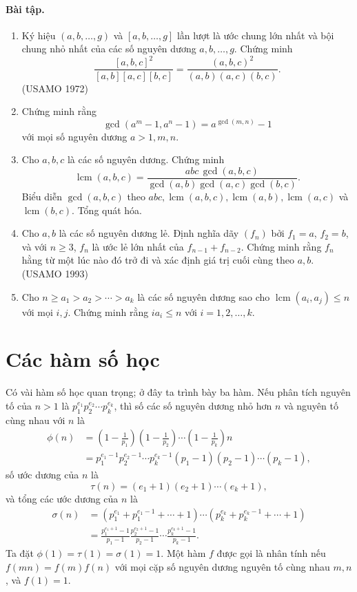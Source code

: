 \documentclass[11pt]{article}
\DeclareMathOperator{\lcm}{lcm}
\begin{document}
\paragraph{Bài tập.}
\begin{enumerate}
\item Ký hiệu \((a,b,\ldots,g)\) và \([a,b,\ldots,g]\) lần lượt là ước chung
lớn nhất và bội chung nhỏ nhất của các số nguyên dương \(a,b,\ldots,g\).
Chứng minh
\[
 \frac{[a,b,c]^2}{[a,b][a,c][b,c]}
 =
 \frac{(a,b,c)^2}{(a,b)(a,c)(b,c)}.
\]
(USAMO 1972)
\item Chứng minh rằng
\[
 \gcd(a^m-1,a^n-1)=a^{\gcd(m,n)}-1
\]
với mọi số nguyên dương \(a>1,m,n\).
\item Cho \(a,b,c\) là các số nguyên dương. Chứng minh
\[
 \lcm(a,b,c)=\frac{abc\,\gcd(a,b,c)}
 {\gcd(a,b)\gcd(a,c)\gcd(b,c)}.
\]
Biểu diễn \(\gcd(a,b,c)\) theo \(abc,\lcm(a,b,c),\lcm(a,b),\lcm(a,c)\) và
\(\lcm(b,c)\). Tổng quát hóa.
\item Cho \(a,b\) là các số nguyên dương lẻ. Định nghĩa dãy \((f_n)\) bởi
\(f_1=a\), \(f_2=b\), và với \(n\ge3\), \(f_n\) là ước lẻ lớn nhất của
\(f_{n-1}+f_{n-2}\). Chứng minh rằng \(f_n\) hằng từ một lúc nào đó trở đi và
xác định giá trị cuối cùng theo \(a,b\). (USAMO 1993)
\item Cho \(n\ge a_1>a_2>\cdots>a_k\) là các số nguyên dương sao cho
\(\lcm(a_i,a_j)\le n\) với mọi \(i,j\). Chứng minh rằng \(ia_i\le n\) với
\(i=1,2,\ldots,k\).
\end{enumerate}

\section{Các hàm số học}

Có vài hàm số học quan trọng; ở đây ta trình bày ba hàm. Nếu phân tích nguyên
tố của \(n>1\) là \(p_1^{e_1}p_2^{e_2}\cdots p_k^{e_k}\), thì số các số
nguyên dương nhỏ hơn \(n\) và nguyên tố cùng nhau với \(n\) là
\[
\begin{aligned}
\phi(n)
&=\left(1-\frac1{p_1}\right)\left(1-\frac1{p_2}\right)\cdots
\left(1-\frac1{p_k}\right)n\\
&=p_1^{e_1-1}p_2^{e_2-1}\cdots p_k^{e_k-1}
(p_1-1)(p_2-1)\cdots(p_k-1),
\end{aligned}
\]
số ước dương của \(n\) là
\[
 \tau(n)=(e_1+1)(e_2+1)\cdots(e_k+1),
\]
và tổng các ước dương của \(n\) là
\[
\begin{aligned}
\sigma(n)
&=(p_1^{e_1}+p_1^{e_1-1}+\cdots+1)\cdots
(p_k^{e_k}+p_k^{e_k-1}+\cdots+1)\\
&=\frac{p_1^{e_1+1}-1}{p_1-1}\frac{p_2^{e_2+1}-1}{p_2-1}
\cdots\frac{p_k^{e_k+1}-1}{p_k-1}.
\end{aligned}
\]
Ta đặt \(\phi(1)=\tau(1)=\sigma(1)=1\). Một hàm \(f\) được gọi là nhân tính nếu
\(f(mn)=f(m)f(n)\) với mọi cặp số nguyên dương nguyên tố cùng nhau \(m,n\), và
\(f(1)=1\).
\end{document}
